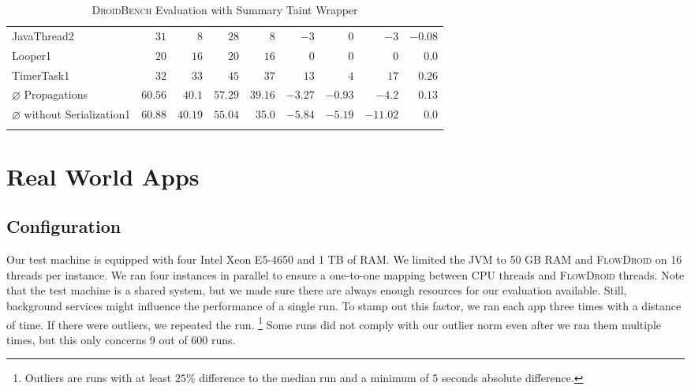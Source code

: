 \documentclass[../draft.tex]{subfiles}
\begin{document}
\begin{longtable}{l | r | r | r | r | r | r | r | r}
        JavaThread2 & $31$ & $8$ & $28$ & $8$ & $-3$ & $0$ & $-3$ & $-0.08$\\
        Looper1 & $20$ & $16$ & $20$ & $16$ & $0$ & $0$ & $0$ & $0.0$\\
        TimerTask1 & $32$ & $33$ & $45$ & $37$ & $13$ & $4$ & $17$ & $0.26$\\
        \hhline
        $\varnothing$ Propagations & $60.56$ & $40.1$ & $57.29$ & $39.16$ & $-3.27$ & $-0.93$ & $-4.2$ & $0.13$\\
        $\varnothing$ without Serialization1& $60.88$ & $40.19$ & $55.04$ & $35.0$ & $-5.84$ & $-5.19$ & $-11.02$ & $0.0$\\
        \caption{\textsc{DroidBench} Evaluation with Summary Taint Wrapper}
        \label{t:droidbenchevaluation_sum}
    \end{longtable}
    \normalsize

    \section{Real World Apps}\label{s:realworld}

    \subsection{Configuration}
    Our test machine is equipped with four Intel Xeon E5-4650 and 1 TB of RAM.
    We limited the JVM to 50 GB RAM and \textsc{FlowDroid} on 16 threads per instance.
    We ran four instances in parallel to ensure a one-to-one mapping between CPU threads and \textsc{FlowDroid} threads.
    Note that the test machine is a shared system, but we made sure there are always enough resources for our evaluation available.
    Still, background services might influence the performance of a single run. To stamp out this factor, we ran each app three times with a distance of time\footnotemark.
    If there were outliers\footnotemark{}, we repeated the run.
    \footnote{Outliers are runs with at least $25\%$ difference to the median run and a minimum of $5$ seconds absolute difference.}
    Some runs did not comply with our outlier norm even after we ran them multiple times, but this only concerns 9 out of 600 runs.
\end{document}
